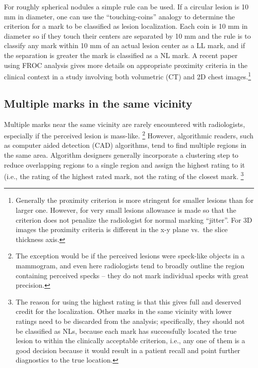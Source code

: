 \documentclass[
]{book}
\begin{document}
For roughly spherical nodules a simple rule can be used. If a circular lesion is 10 mm in diameter, one can use the ``touching-coins'' analogy to determine the criterion for a mark to be classified as lesion localization. Each coin is 10 mm in diameter so if they touch their centers are separated by 10 mm and the rule is to classify any mark within 10 mm of an actual lesion center as a LL mark, and if the separation is greater the mark is classified as a NL mark. A recent paper \citep{Dobbins2016MultiInstitutional} using FROC analysis gives more details on appropriate proximity criteria in the clinical context in a study involving both volumetric (CT) and 2D chest images.\footnote{Generally the proximity criterion is more stringent for smaller lesions than for larger one. However, for very small lesions allowance is made so that the criterion does not penalize the radiologist for normal marking ``jitter''. For 3D images the proximity criteria is different in the x-y plane vs.~the slice thickness axis.}

\hypertarget{multiple-marks-in-the-same-vicinity}{%
\subsection{Multiple marks in the same vicinity}\label{multiple-marks-in-the-same-vicinity}}

Multiple marks near the same vicinity are rarely encountered with radiologists, especially if the perceived lesion is mass-like. \footnote{The exception would be if the perceived lesions were speck-like objects in a mammogram, and even here radiologists tend to broadly outline the region containing perceived specks -- they do not mark individual specks with great precision.} However, algorithmic readers, such as computer aided detection (CAD) algorithms, tend to find multiple regions in the same area. Algorithm designers generally incorporate a clustering step to reduce overlapping regions to a single region and assign the highest rating to it (i.e., the rating of the highest rated mark, not the rating of the closest mark. \footnote{The reason for using the highest rating is that this gives full and deserved credit for the localization. Other marks in the same vicinity with lower ratings need to be discarded from the analysis; specifically, they should not be classified as NLs, because each mark has successfully located the true lesion to within the clinically acceptable criterion, i.e., any one of them is a good decision because it would result in a patient recall and point further diagnostics to the true location.}
\end{document}
